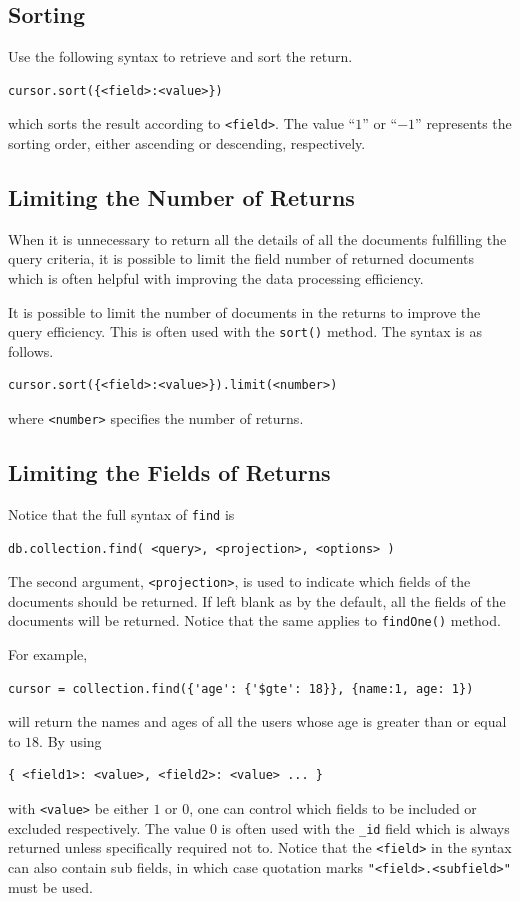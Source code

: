 \subsection{Sorting}

Use the following syntax to retrieve and sort the return.
\begin{lstlisting}
cursor.sort({<field>:<value>})
\end{lstlisting}
which sorts the result according to \verb|<field>|. The value ``$1$'' or ``$-1$'' represents the sorting order, either ascending or descending, respectively.

\subsection{Limiting the Number of Returns}

When it is unnecessary to return all the details of all the documents fulfilling the query criteria, it is possible to limit the field number of returned documents which is often helpful with improving the data processing efficiency.

It is possible to limit the number of documents in the returns to improve the query efficiency. This is often used with the \verb|sort()| method. The syntax is as follows.
\begin{lstlisting}
cursor.sort({<field>:<value>}).limit(<number>)
\end{lstlisting}
where \verb|<number>| specifies the number of returns.

\subsection{Limiting the Fields of Returns}

Notice that the full syntax of \verb|find| is
\begin{lstlisting}
db.collection.find( <query>, <projection>, <options> )
\end{lstlisting}
The second argument, \verb|<projection>|, is used to indicate which fields of the documents should be returned. If left blank as by the default, all the fields of the documents will be returned. Notice that the same applies to \verb|findOne()| method.

For example,
\begin{lstlisting}
cursor = collection.find({'age': {'$gte': 18}}, {name:1, age: 1})
\end{lstlisting}
will return the names and ages of all the users whose age is greater than or equal to $18$. By using
\begin{lstlisting}
{ <field1>: <value>, <field2>: <value> ... }
\end{lstlisting}
with \verb|<value>| be either $1$ or $0$, one can control which fields to be included or excluded respectively. The value $0$ is often used with the \verb|_id| field which is always returned unless specifically required not to. Notice that the \verb|<field>| in the syntax can also contain sub fields, in which case quotation marks \verb|"<field>.<subfield>"| must be used.

